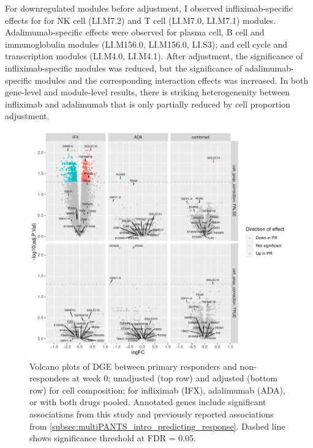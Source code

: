 For downregulated modules before adjustment, I observed infliximab-specific effects for for NK cell (LI.M7.2) and T cell (LI.M7.0, LI.M7.1) modules.
Adalimumab-specific effects were observed for plasma cell, B cell and immunoglobulin modules (LI.M156.0, LI.M156.0, LI.S3); and cell cycle and transcription modules (LI.M4.0, LI.M4.1).
After adjustment, the significance of infliximab-specific modules was reduced, 
but the significance of adalimumab-specific modules and the corresponding interaction effects was increased.
In both gene-level and module-level results, there is striking heterogenenity between infliximab and adalimumab that is only partially reduced by cell proportion adjustment.


\begin{figure}
    \centering
    \includegraphics[width=1.0\textwidth,page=1]{mainmatter/figures/chapter_04/plot_gene_set_enrichment.dge_result_volcano_simple_C_1RI_1NI,C_1RA_1NA,C_1R_1N.pdf}
    \caption{Volcano plots of \gls{DGE} between primary responders and non-responders at week 0; unadjusted (top row) and adjusted (bottom row) for cell composition; for infliximab (IFX), adalimumab (ADA), or with both drugs pooled. Annotated genes include significant associations from this study and previously reported associations from \autoref{subsec:multiPANTS_intro_predicting_response}. Dashed line shows significance threshold at FDR = 0.05.}
    \label{fig:multipants_dge_volcano_week_0_R_N}
\end{figure}

